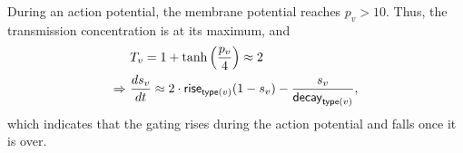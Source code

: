 During an action potential, the membrane potential reaches $p_v > 10$. Thus, the transmission concentration is at its maximum, and
\begin{gather}
\begin{split}
    & T_v = 1 + \tanh \left( \frac{p_{v}}{4} \right) \approx 2 \\
    \Rightarrow \ & \frac{ds_v}{dt} \approx 2 \cdot \mathsf{rise}_{\mathsf{type}(v)} (1 - s_v) - \frac{s_v}{\mathsf{decay}_{\mathsf{type}(v)}},
\end{split}
\end{gather}
which indicates that the gating rises during the action potential and falls once it is over. 